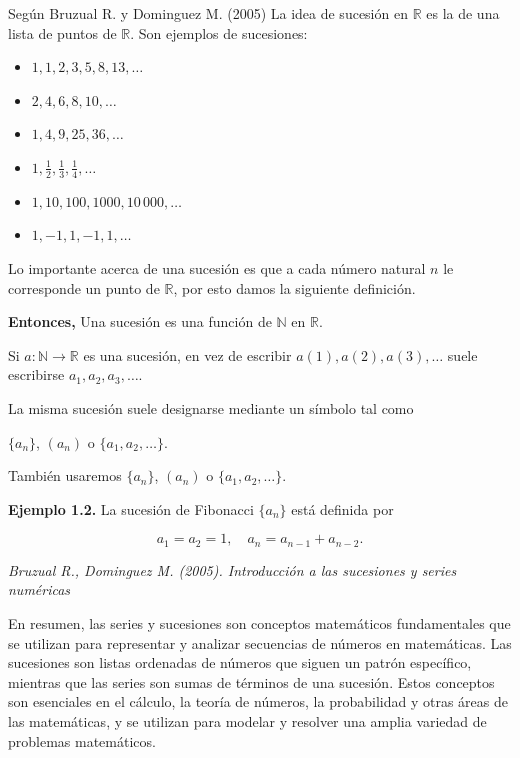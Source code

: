 \documentclass[11pt, a4paper]{article}
\begin{document}
  Según Bruzual R. y Dominguez M. (2005) La idea de sucesión en $\mathbb{R}$ es la de una lista de puntos de $\mathbb{R}$. Son ejemplos de sucesiones:

  \begin{itemize}
      \item $1, 1, 2, 3, 5, 8, 13, \dots$
      \item $2, 4, 6, 8, 10, \dots$
      \item $1, 4, 9, 25, 36, \dots$
      \item $1, \frac{1}{2}, \frac{1}{3}, \frac{1}{4}, \dots$
      \item $1, 10, 100, 1000, 10\,000, \dots$
      \item $1, -1, 1, -1, 1, \dots$
  \end{itemize}
  
  Lo importante acerca de una sucesión es que a cada número natural $n$ le corresponde un punto de $\mathbb{R}$, por esto damos la siguiente definición.
  
  \textbf{Entonces,} Una sucesión es una función de $\mathbb{N}$ en $\mathbb{R}$.
  
  Si $a : \mathbb{N} \to \mathbb{R}$ es una sucesión, en vez de escribir $a(1), a(2), a(3), \dots$ suele escribirse $a_1, a_2, a_3, \dots$.
  
  La misma sucesión suele designarse mediante un símbolo tal como
  
  \begin{center}
    $\{a_n\}$, $(a_n)$ o $\{a_1, a_2, \dots\}$.
  \end{center}
  
  También usaremos $\{a_n\}$, $(a_n)$ o $\{a_1, a_2, \dots\}$.
  
  \textbf{Ejemplo 1.2.} La sucesión de Fibonacci $\{a_n\}$ está definida por
  
  \[
  a_1 = a_2 = 1, \quad a_n = a_{n-1} + a_{n-2}.
  \]
  

\begin{flushright}
  \textit{Bruzual R., Dominguez M. (2005). Introducción a las sucesiones y series numéricas}
\end{flushright}
  
  En resumen, las series y sucesiones son conceptos matemáticos fundamentales que se utilizan para representar y analizar secuencias de números en matemáticas. Las sucesiones son listas ordenadas de números que siguen un patrón específico, mientras que las series son sumas de términos de una sucesión. Estos conceptos son esenciales en el cálculo, la teoría de números, la probabilidad y otras áreas de las matemáticas, y se utilizan para modelar y resolver una amplia variedad de problemas matemáticos.
\end{document}
